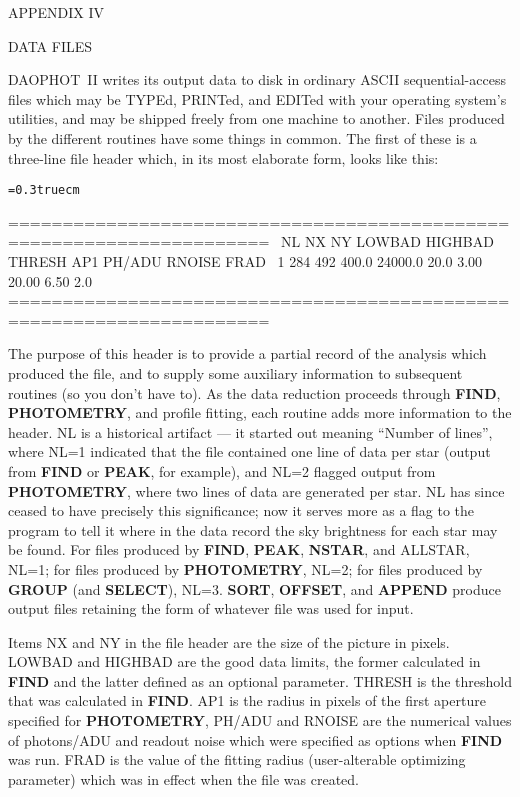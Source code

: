 \vfill
\eject
\centerline{APPENDIX  IV}
\bigskip
\centerline{DATA FILES}
\medskip

DAOPHOT~II writes its output data to disk in ordinary ASCII
sequential-access files which may be TYPEd, PRINTed, and EDITed with
your operating system's utilities, and may be shipped freely from one
machine to another.  Files produced by the different routines have some
things in common.  The first of these is a three-line file header
which, in its most elaborate form, looks like this:

\bigskip
{\noindent\obeylines\obeyspaces\frenchspacing\tt\baselineskip=0.3truecm

======================================================================
\ NL   NX   NY  LOWBAD HIGHBAD  THRESH     AP1  PH/ADU  RNOISE    FRAD
\  1  284  492   400.0 24000.0    20.0    3.00   20.00    6.50     2.0
~~~~~~~~~~~~
======================================================================
}
\bigskip

The purpose of this header is to provide a partial record of the
analysis which produced the file, and to supply some auxiliary
information to subsequent routines (so you don't have to).  As the data
reduction proceeds through {\bf FIND}, {\bf PHOTOMETRY}, and profile
fitting, each routine adds more information to the header. NL is a
historical artifact --- it started out meaning ``Number of lines'',
where NL=1 indicated that the file contained one line of data per star
(output from {\bf FIND} or {\bf PEAK}, for example), and NL=2 flagged
output from {\bf PHOTOMETRY}, where two lines of data are generated per
star.  NL has since ceased to have precisely this significance; now it
serves more as a flag to the program to tell it where in the data
record the sky brightness for each star may be found.  For files
produced by {\bf FIND}, {\bf PEAK}, {\bf NSTAR}, and ALLSTAR, NL=1; for
files produced by {\bf PHOTOMETRY}, NL=2; for files produced by {\bf
GROUP} (and {\bf SELECT}), NL=3.  {\bf SORT}, {\bf OFFSET}, and {\bf
APPEND} produce output files retaining the form of whatever file was
used for input.

Items NX and NY in the file header are the size of the picture in
pixels. LOWBAD and HIGHBAD are the good data limits, the former
calculated in {\bf FIND} and the latter defined as an optional
parameter.  THRESH is the threshold that was calculated in {\bf FIND}.
AP1 is the radius in pixels of the first aperture specified for {\bf
PHOTOMETRY}, PH/ADU and RNOISE are the numerical values of photons/ADU
and readout noise which were specified as options when {\bf FIND} was
run.  FRAD is the value of the fitting radius (user-alterable
optimizing parameter) which was in effect when the file was created.

